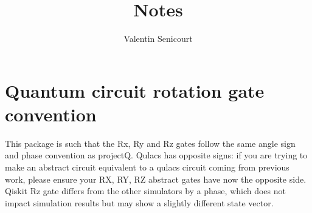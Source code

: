 \documentclass{article}
\title{Notes}
\author{ Valentin Senicourt}
\begin{document}
\maketitle

\section{Quantum circuit rotation gate convention}

This package is such that the Rx, Ry and Rz gates follow the same angle sign and phase convention as projectQ.
Qulacs has opposite signs: if you are trying to make an abstract circuit equivalent to a qulacs circuit coming from
previous work, please ensure your RX, RY, RZ abstract gates have now the opposite side.
Qiskit Rz gate differs from the other simulators by a phase, which does not impact simulation results but may show
a slightly different state vector.
\end{document}
